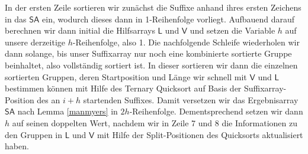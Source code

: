 In der ersten Zeile sortieren wir zunächst die Suffixe anhand ihres ersten Zeichens in das $\mathsf{SA}$ ein, wodurch dieses dann in 1-Reihenfolge vorliegt. Aufbauend darauf berechnen wir dann initial die Hilfsarrays $\mathsf{L}$ und $\mathsf{V}$ und setzen die Variable $h$ auf unsere derzeitige $h$-Reihenfolge, also 1.
Die nachfolgende Schleife wiederholen wir dann solange, bis unser Suffixarray nur noch eine kombinierte sortierte Gruppe beinhaltet, also vollständig sortiert ist.
In dieser sortieren wir dann die einzelnen sortierten Gruppen, deren Startposition und Länge wir schnell mit $\mathsf{V}$ und $\mathsf{L}$ bestimmen können mit Hilfe des Ternary Quicksort auf Basis der Suffixarray-Position des an $i+h$ startenden Suffixes. Damit versetzen wir das Ergebnisarray $\mathsf{SA}$ nach Lemma \ref{manmyers} in $2h$-Reihenfolge. Dementsprechend setzen wir dann $h$ auf seinen doppelten Wert, nachdem wir in Zeile 7 und 8 die Informationen zu den Gruppen in $\mathsf{L}$ und $\mathsf{V}$ mit Hilfe der Split-Positionen des Quicksorts aktualisiert haben.\\
